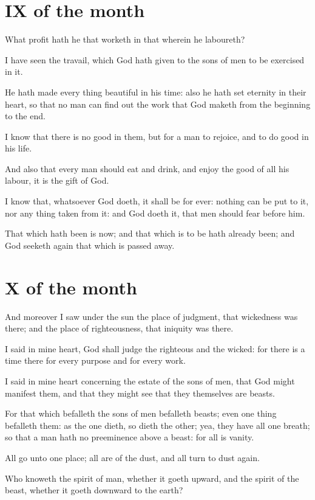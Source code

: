\section*{IX of the month}

What profit hath he that worketh in that wherein he laboureth?

I have seen the travail, which God hath given to the sons of men to be exercised in it.

 He hath made every thing beautiful in his time: also he hath set eternity in their heart, so that no man can find out the work that God maketh from the beginning to the end.

I know that there is no good in them, but for a man to rejoice, and to do good in his life.

And also that every man should eat and drink, and enjoy the good of all his labour, it is the gift of God.

I know that, whatsoever God doeth, it shall be for ever: nothing can be put to it, nor any thing taken from it: and God doeth it, that men should fear before him.

 That which hath been is now; and that which is to be hath already been; and God seeketh again that which is passed away.

\section*{X of the month}

And moreover I saw under the sun the place of judgment, that wickedness was there; and the place of righteousness, that iniquity was there.

I said in mine heart, God shall judge the righteous and the wicked: for there is a time there for every purpose and for every work.

I said in mine heart concerning the estate of the sons of men, that God might manifest them, and that they might see that they themselves are beasts.

For that which befalleth the sons of men befalleth beasts; even one thing befalleth them: as the one dieth, so dieth the other; yea, they have all one breath; so that a man hath no preeminence above a beast: for all is vanity.

All go unto one place; all are of the dust, and all turn to dust again.

 Who knoweth the spirit of man, whether it goeth upward, and the spirit of the beast, whether it goeth downward to the earth?

